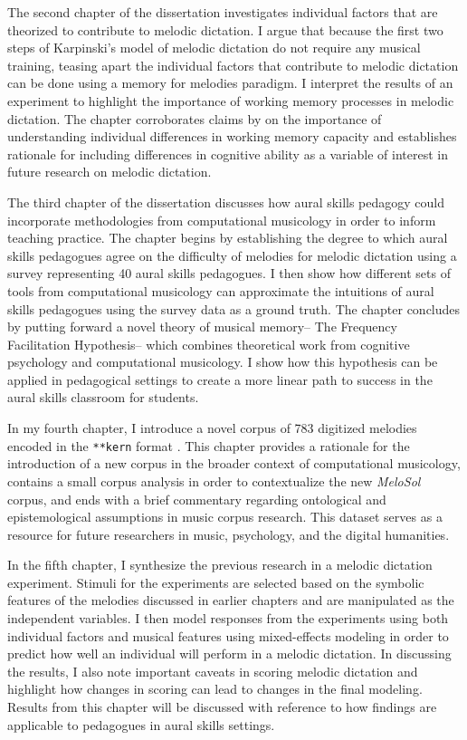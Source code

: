 \documentclass[12pt,]{book}
\begin{document}
The second chapter of the dissertation investigates individual factors that are theorized to contribute to melodic dictation.
I argue that because the first two steps of Karpinski's model of melodic dictation do not require any musical training, teasing apart the individual factors that contribute to melodic dictation can be done using a memory for melodies paradigm.
I interpret the results of an experiment to highlight the importance of working memory processes in melodic dictation.
The chapter corroborates claims by \citet{berzWorkingMemoryMusic1995} on the importance of understanding individual differences in working memory capacity and establishes rationale for including differences in cognitive ability as a variable of interest in future research on melodic dictation.

The third chapter of the dissertation discusses how aural skills pedagogy could incorporate methodologies from computational musicology in order to inform teaching practice.
The chapter begins by establishing the degree to which aural skills pedagogues agree on the difficulty of melodies for melodic dictation using a survey representing 40 aural skills pedagogues.
I then show how different sets of tools from computational musicology can approximate the intuitions of aural skills pedagogues using the survey data as a ground truth.
The chapter concludes by putting forward a novel theory of musical memory-- The Frequency Facilitation Hypothesis-- which combines theoretical work from cognitive psychology and computational musicology.
I show how this hypothesis can be applied in pedagogical settings to create a more linear path to success in the aural skills classroom for students.

In my fourth chapter, I introduce a novel corpus of 783 digitized melodies encoded in the \texttt{**kern}
format \citep{huronHumdrumToolkitReference1994}.
This chapter provides a rationale for the introduction of a new corpus in the broader context of computational musicology, contains a small corpus analysis in order to contextualize the new \emph{MeloSol} corpus, and ends with a brief commentary regarding ontological and epistemological assumptions in music corpus research.
This dataset serves as a resource for future researchers in music, psychology, and the digital humanities.

In the fifth chapter, I synthesize the previous research in a melodic dictation experiment.
Stimuli for the experiments are selected based on the symbolic features of the melodies discussed in earlier chapters and are manipulated as the independent variables.
I then model responses from the experiments using both individual factors and musical features using mixed-effects modeling in order to predict how well an individual will perform in a melodic dictation.
In discussing the results, I also note important caveats in scoring melodic dictation and highlight how changes in scoring can lead to changes in the final modeling.
Results from this chapter will be discussed with reference to how findings are applicable to pedagogues in aural skills settings.
\end{document}
